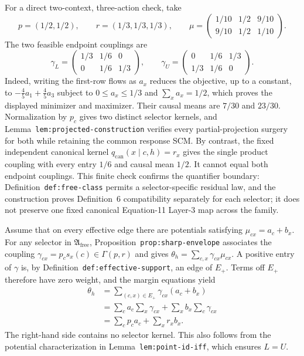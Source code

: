 For a direct two-context, three-action check, take
\[
p=(1/2,1/2),\qquad r=(1/3,1/3,1/3),\qquad
\mu=\begin{pmatrix}1/10&1/2&9/10\\9/10&1/2&1/10\end{pmatrix}.
\]
The two feasible endpoint couplings are
\[
\gamma_L=\begin{pmatrix}1/3&1/6&0\\0&1/6&1/3\end{pmatrix},
\qquad
\gamma_U=\begin{pmatrix}0&1/6&1/3\\1/3&1/6&0\end{pmatrix}.
\]
Indeed, writing the first-row flows as \(a_x\) reduces the objective, up to a constant, to \(-\frac45a_1+\frac45a_3\) subject to \(0\leq a_x\leq1/3\) and \(\sum_xa_x=1/2\), which proves the displayed minimizer and maximizer.  Their causal means are \(7/30\) and \(23/30\).  Normalization by \(p_c\) gives two distinct selector kernels, and Lemma~\texttt{lem:projected-construction} verifies every partial-projection surgery for both while retaining the common response SCM.  By contrast, the fixed independent canonical kernel \(q_{\mathrm{can}}(x\mid c,h)=r_x\) gives the single product coupling with every entry \(1/6\) and causal mean \(1/2\).  It cannot equal both endpoint couplings.  This finite check confirms the quantifier boundary: Definition~\texttt{def:free-class} permits a selector-specific residual law, and the construction proves Definition~6 compatibility separately for each selector; it does not preserve one fixed canonical Equation-11 Layer-3 map across the family.

Assume that on every effective edge there are potentials satisfying \(\mu_{cx}=a_c+b_x\).  For any selector in \(\mathfrak A_{\mathrm{free}}\), Proposition~\texttt{prop:sharp-envelope} associates the coupling \(\gamma_{cx}=p_cs_x(c)\in\Gamma(p,r)\) and gives \(\theta_h=\sum_{c,x}\gamma_{cx}\mu_{cx}\).  A positive entry of \(\gamma\) is, by Definition~\texttt{def:effective-support}, an edge of \(E_+\).  Terms off \(E_+\) therefore have zero weight, and the margin equations yield
\[
\begin{aligned}
\theta_h
&=\sum_{(c,x)\in E_+}\gamma_{cx}(a_c+b_x)\\
&=\sum_ca_c\sum_x\gamma_{cx}+\sum_xb_x\sum_c\gamma_{cx}\\
&=\sum_cp_ca_c+\sum_xr_xb_x.
\end{aligned}
\]
The right-hand side contains no selector kernel.  This also follows from the potential characterization in Lemma~\texttt{lem:point-id-iff}, which ensures \(L=U\).

